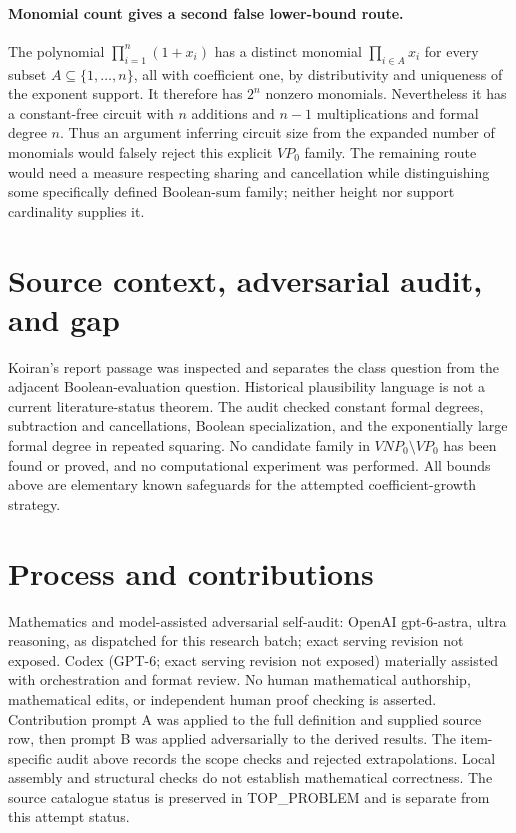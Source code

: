 \documentclass[11pt]{article}
\begin{document}
\paragraph{Monomial count gives a second false lower-bound route.}
The polynomial $\prod_{i=1}^n(1+x_i)$ has a distinct monomial
$\prod_{i\in A}x_i$ for every subset $A\subseteq\{1,\ldots,n\}$,
all with coefficient one, by distributivity and uniqueness of the exponent
support. It therefore has $2^n$ nonzero monomials. Nevertheless it has a
constant-free circuit with $n$ additions and $n-1$ multiplications and formal
degree $n$. Thus an argument inferring circuit size from the expanded number
of monomials would falsely reject this explicit $VP_0$ family.
The remaining route would need a measure respecting sharing and cancellation
while distinguishing some specifically defined Boolean-sum family; neither
height nor support cardinality supplies it.

\section{Source context, adversarial audit, and gap}
Koiran's report passage was inspected and separates the class question from
the adjacent Boolean-evaluation question. Historical plausibility language
is not a current literature-status theorem. The audit checked constant formal
degrees, subtraction and cancellations, Boolean specialization, and the
exponentially large formal degree in repeated squaring. No candidate family
in $VNP_0\setminus VP_0$ has been found or proved, and no computational
experiment was performed. All bounds above are elementary known safeguards
for the attempted coefficient-growth strategy.

\section{Process and contributions}
Mathematics and model-assisted adversarial self-audit: OpenAI gpt-6-astra, ultra reasoning, as dispatched for this research batch; exact serving revision not exposed. Codex (GPT-6; exact serving revision not exposed) materially assisted with orchestration and format review. No human mathematical authorship, mathematical edits, or independent human proof checking is asserted.
Contribution prompt A was applied to the full definition and supplied source row, then prompt B was applied adversarially to the derived results. The item-specific audit above records the scope checks and rejected extrapolations. Local assembly and structural checks do not establish mathematical correctness. The source catalogue status is preserved in TOP\_PROBLEM and is separate from this attempt status.
\end{document}
